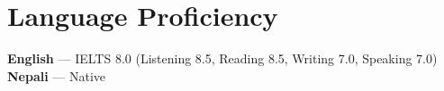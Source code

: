 \documentclass[letterpaper,11pt]{article}
\begin{document}
\section{Language Proficiency}
 \begin{itemize}[leftmargin=0.15in, label={}, itemsep=1pt, parsep=0pt, topsep=1pt]
    \small{\item{
     \textbf{English} --- IELTS 8.0 (Listening 8.5, Reading 8.5, Writing 7.0, Speaking 7.0) \\
     \textbf{Nepali} --- Native
    }}
 \end{itemize}
\end{document}

